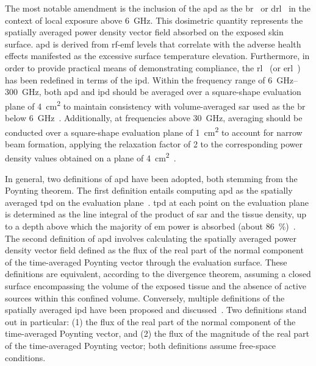The most notable amendment is the inclusion of the \gls{apd} as the \gls{br}~\cite{ICNIRP2020Guidelines} or \gls{drl}~\cite{IEEE2019Standard} in the context of local exposure above \SI{6}{\GHz}.
This dosimetric quantity represents the spatially averaged power density vector field absorbed on the exposed skin surface.
\Gls{apd} is derived from \gls{rf}-\gls{emf} levels that correlate with the adverse health effects manifested as the excessive surface temperature elevation.
Furthermore, in order to provide practical means of demonstrating compliance, the \gls{rl}~\cite{ICNIRP2020Guidelines} (or \gls{erl}~\cite{IEEE2019Standard}) has been redefined in terms of the \gls{ipd}.
Within the frequency range of \SIrange{6}{300}{\GHz}, both \gls{apd} and \gls{ipd} should be averaged over a square-shape evaluation plane of \SI{4}{\cm\squared} to maintain consistency with volume-averaged \gls{sar} used as the \gls{br} below \SI{6}{\GHz}~\cite{Funahashi2018Averaging,Hashimoto2017averaging}.
Additionally, at frequencies above \SI{30}{\GHz}, averaging should be conducted over a square-shape evaluation plane of \SI{1}{\cm\squared} to account for narrow beam formation, applying the relaxation factor of \num{2} to the corresponding power density values obtained on a plane of \SI{4}{\cm\squared}~\cite{Foster2016Thermal}.

In general, two definitions of \gls{apd} have been adopted, both stemming from the Poynting theorem.
The first definition entails computing \gls{apd} as the spatially averaged \gls{tpd} on the evaluation plane~\cite{Hirata2018Review}.
\Gls{tpd} at each point on the evaluation plane is determined as the line integral of the product of \gls{sar} and the tissue density, up to a depth above which the majority of \gls{em} power is absorbed (about \SI{86}{\percent})~\cite{Funahashi2018Area-averaged}.
The second definition of \gls{apd} involves calculating the spatially averaged power density vector field defined as the flux of the real part of the normal component of the time-averaged Poynting vector through the evaluation surface.
These definitions are equivalent, according to the divergence theorem, assuming a closed surface encompassing the volume of the exposed tissue and the absence of active sources within this confined volume.
Conversely, multiple definitions of the spatially averaged \gls{ipd} have been proposed and discussed~\cite{IEEE2021Guide}.
Two definitions stand out in particular: (1) the flux of the real part of the normal component of the time-averaged Poynting vector, and (2) the flux of the magnitude of the real part of the time-averaged Poynting vector; both definitions assume free-space conditions.

